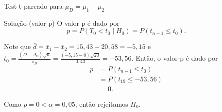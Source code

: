 \documentclass[9pt]{beamer}
\begin{document}
\begin{frame}{Test t pareado para $\mu_D = \mu_1 - \mu_2$}

\begin{block}{Solução (valor-p)}
	O valor-p é dado por
	$$p = P(T_0 < t_0 \mid H_0) = P(t_{n-1} \leq t_0).$$
	
	Note que $\bar{d} = \bar{x}_1 - \bar{x}_2 = 15,43 - 20,58 = -5,15$ e $t_0 = \frac{(\bar{D} - \Delta_0)\sqrt{n}}{s_D} = \frac{(-5,15 - 0)\sqrt{20}}{0,43} = -53,56$. Então, o valor-p é dado por
	\begin{align*}
	p &= P(t_{n-1} \leq t_0)\\
	&= P(t_{19} \leq -53,56)\\
	&= 0.
	\end{align*}
	
	Como $p=0 < \alpha = 0,05$, então rejeitamos $H_0$.
\end{block}

\end{frame}
\end{document}
